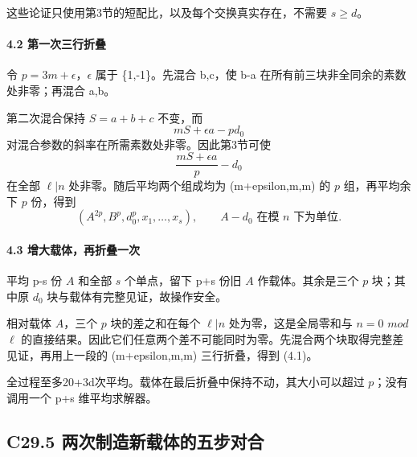 {这些论证只使用第3节的短配比，以及每个交换真实存在，不需要} {\ensuremath{s\ge d}。}

\paragraph*{\texorpdfstring{{4.2} {第一次三行折叠}}{4.2 第一次三行折叠}}\label{C29-h186}

{令} {\ensuremath{p=3m+\epsilon }，\ensuremath{\epsilon }} {属于} {\{1,-1\}。先混合} {b,c，使} {b-a} {在所有前三块非全同余的素数处非零；再混合} {a,b。}

{第二次混合保持} {\ensuremath{S=a+b+c}} {不变，而} \[
mS+\epsilon a-pd_0
\] {对混合参数的斜率在所需素数处非零。因此第3节可使} \[
\frac{mS+\epsilon a}{p}-d_0
\] {在全部} {\ensuremath{\ell |n}} {处非零。随后平均两个组成均为} {(m+epsilon,m,m)} {的} {\ensuremath{p}} {组，再平均余下} {\ensuremath{p}} {份，得到} \[
(A^{2p},B^p,d_0^p,x_1,\ldots,x_s),
\qquad A-d_0\text{ 在模 }n\text{ 下为单位}.
\]

\paragraph*{\texorpdfstring{{4.3} {增大载体，再折叠一次}}{4.3 增大载体，再折叠一次}}\label{C29-h187}

{平均} {p-s} {份} {\ensuremath{A}} {和全部} {\ensuremath{s}} {个单点，留下} {p+s} {份旧} {\ensuremath{A}} {作载体。其余是三个} {\ensuremath{p}} {块；其中原} {\ensuremath{d_{0}}} {块与载体有完整见证，故操作安全。}

{相对载体} {\ensuremath{A}，三个} {\ensuremath{p}} {块的差之和在每个} {\ensuremath{\ell |n}} {处为零，这是全局零和与} {\ensuremath{n=0}} {\ensuremath{mod}} {\ensuremath{\ell }} {的直接结果。因此它们任意两个差不可能同时为零。先混合两个块取得完整差见证，再用上一段的} {(m+epsilon,m,m)} {三行折叠，得到} {(4.1)。}

{全过程至多20+3d次平均。载体在最后折叠中保持不动，其大小可以超过} {\ensuremath{p}；没有调用一个} {p+s} {维平均求解器。}

\subsection*{\texorpdfstring{{C29.5} {两次制造新载体的五步对合}}{C29.5 两次制造新载体的五步对合}}\label{C29-h188}

